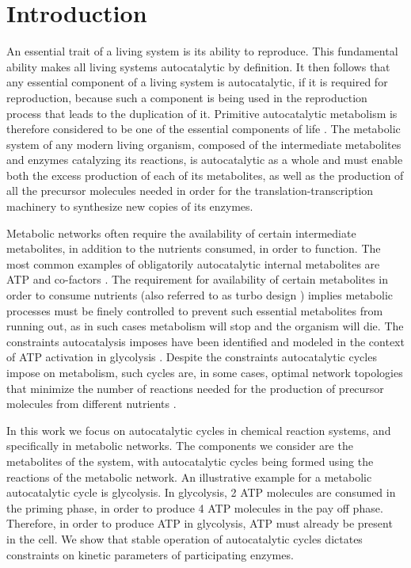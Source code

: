 \section{Introduction}
    An essential trait of a living system is its ability to reproduce.
    This fundamental ability makes all living systems autocatalytic by definition.
    It then follows that any essential component of a living system is autocatalytic, if it is required for reproduction, because  such a component is being used in the reproduction process that leads to the duplication of it.
    Primitive autocatalytic metabolism is therefore considered to be one of the essential components of life \cite{Ganti2003-ch}.
    The metabolic system of any modern living organism, composed of the intermediate metabolites and enzymes catalyzing its reactions, is autocatalytic as a whole and must enable both the excess production of each of its metabolites, as well as the production of all the precursor molecules needed in order for the translation-transcription machinery to synthesize new copies of its enzymes.

    Metabolic networks often require the availability of certain intermediate metabolites, in addition to the nutrients consumed, in order to function.
    The most common examples of obligatorily autocatalytic internal metabolites are ATP and co-factors \cite{Kun2008-xg}.
    The requirement for availability of certain metabolites in order to consume nutrients (also referred to as turbo design \cite{Teusink1998-he}) implies metabolic processes must be finely controlled to prevent such essential metabolites from running out, as in such cases metabolism will stop and the organism will die.
    The constraints autocatalysis imposes have been identified and modeled in the context of ATP activation in glycolysis \cite{Teusink1998-he}.
    Despite the constraints autocatalytic cycles impose on metabolism, such cycles are, in some cases, optimal network topologies that minimize the number of reactions needed for the production of precursor molecules from different nutrients \cite{Riehl2010-yh}.

    In this work we focus on autocatalytic cycles in chemical reaction systems, and specifically in metabolic networks.
    The components we consider are the metabolites of the system, with autocatalytic cycles being formed using the reactions of the metabolic network.
    An illustrative example for a metabolic autocatalytic cycle is glycolysis.
    In glycolysis, 2 ATP molecules are consumed in the priming phase, in order to produce 4 ATP molecules in the pay off phase.
    Therefore, in order to produce ATP in glycolysis, ATP must already be present in the cell.
    We show that stable operation of autocatalytic cycles dictates constraints on kinetic parameters of participating enzymes.

